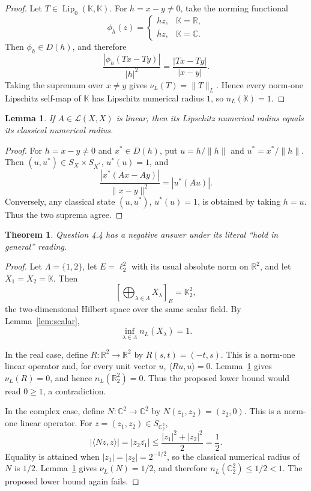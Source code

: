 \documentclass[11pt]{article}
\newtheorem{theorem}{Theorem}
\newtheorem{lemma}{Lemma}
\newcommand{\K}{\mathbb K}
\newcommand{\R}{\mathbb R}
\newcommand{\C}{\mathbb C}
\newcommand{\Lip}{\operatorname{Lip}_0}
\newcommand{\nL}{n_L}
\newcommand{\nuL}{\nu_L}
\begin{document}
\begin{proof}
Let \(T\in\Lip(\K,\K)\).  For \(h=x-y\ne 0\), take the norming functional
\[
\phi_h(z)=
\begin{cases}
hz, & \K=\R,\\
\overline h z, & \K=\C.
\end{cases}
\]
Then \(\phi_h\in D(h)\), and therefore
\[
\frac{|\phi_h(Tx-Ty)|}{|h|^2}
=\frac{|Tx-Ty|}{|x-y|}.
\]
Taking the supremum over \(x\ne y\) gives \(\nuL(T)=\|T\|_L\).  Hence every norm-one Lipschitz self-map of \(\K\) has Lipschitz numerical radius \(1\), so \(\nL(\K)=1\).
\end{proof}

\begin{lemma}\label{lem:linear}
If \(A\in\mathcal L(X,X)\) is linear, then its Lipschitz numerical radius equals its classical numerical radius.
\end{lemma}

\begin{proof}
For \(h=x-y\ne 0\) and \(x^*\in D(h)\), put \(u=h/\|h\|\) and \(u^*=x^*/\|h\|\).  Then \((u,u^*)\in S_X\times S_{X^*}\), \(u^*(u)=1\), and
\[
\frac{|x^*(Ax-Ay)|}{\|x-y\|^2}=|u^*(Au)|.
\]
Conversely, any classical state \((u,u^*)\), \(u^*(u)=1\), is obtained by taking \(h=u\).  Thus the two suprema agree.
\end{proof}

\begin{theorem}
Question 4.4 has a negative answer under its literal ``hold in general'' reading.
\end{theorem}

\begin{proof}
Let \(\Lambda=\{1,2\}\), let \(E=\ell_2^2\) with its usual absolute norm on \(\R^2\), and let \(X_1=X_2=\K\).  Then
\[
\left[\bigoplus_{\lambda\in\Lambda}X_\lambda\right]_E
=\K^2_2,
\]
the two-dimensional Hilbert space over the same scalar field.  By Lemma~\ref{lem:scalar},
\[
\inf_{\lambda\in\Lambda}\nL(X_\lambda)=1.
\]

In the real case, define \(R:\R^2\to\R^2\) by \(R(s,t)=(-t,s)\).  This is a norm-one linear operator and, for every unit vector \(u\), \(\langle Ru,u\rangle=0\).  Lemma~\ref{lem:linear} gives \(\nuL(R)=0\), and hence \(\nL(\R^2_2)=0\).  Thus the proposed lower bound would read \(0\geq 1\), a contradiction.

In the complex case, define \(N:\C^2\to\C^2\) by \(N(z_1,z_2)=(z_2,0)\).  This is a norm-one linear operator.  For \(z=(z_1,z_2)\in S_{\C^2_2}\),
\[
|\langle Nz,z\rangle|=|z_2\overline{z_1}|\leq \frac{|z_1|^2+|z_2|^2}{2}=\frac12.
\]
Equality is attained when \(|z_1|=|z_2|=2^{-1/2}\), so the classical numerical radius of \(N\) is \(1/2\).  Lemma~\ref{lem:linear} gives \(\nuL(N)=1/2\), and therefore \(\nL(\C^2_2)\leq 1/2<1\).  The proposed lower bound again fails.
\end{proof}
\end{document}
